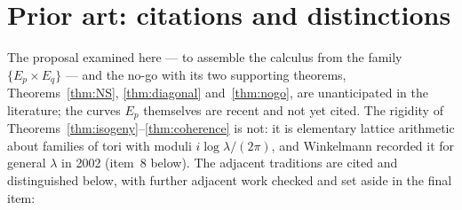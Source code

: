 \documentclass[11pt]{article}
\theoremstyle{definition}
\theoremstyle{remark}
\begin{document}
\section{Prior art: citations and distinctions}
\label{sec:priorart}

The proposal examined here --- to assemble the calculus from the family
$\{E_p \times E_q\}$ --- and the no-go with its two supporting theorems,
Theorems~\ref{thm:NS}, \ref{thm:diagonal} and~\ref{thm:nogo}, are
unanticipated in the literature; the curves $E_p$ themselves are recent and not
yet cited. The rigidity of Theorems~\ref{thm:isogeny}--\ref{thm:coherence} is
not: it is elementary lattice arithmetic about families of tori with moduli
$i \log \lambda/(2\pi)$, and Winkelmann recorded it for general $\lambda$ in
2002 (item~8 below). The adjacent
traditions are cited and distinguished below, with further adjacent work
checked and set aside in the final item:
\end{document}
